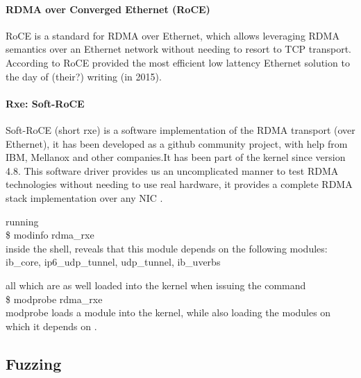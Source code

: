 
\paragraph{RDMA over Converged Ethernet (RoCE)}

RoCE is a standard for RDMA over Ethernet, which allows leveraging RDMA semantics over an Ethernet network without needing
to resort to TCP transport. According to \cite{rdmamanual} RoCE provided the most efficient low lattency Ethernet
solution to the day of (their?) writing (in 2015).

\paragraph{Rxe: Soft-RoCE}

Soft-RoCE (short rxe) is a software implementation of the RDMA transport (over Ethernet), it has been developed as a github 
community project, with help from IBM, Mellanox and other companies.It has been part of the kernel since version 4.8.
This software driver provides us an uncomplicated manner to test RDMA technologies without needing to use real hardware, it provides a complete 
RDMA stack implementation over any NIC \cite{mellanox-community}.

running \\ \$ modinfo rdma\_rxe \\ inside the shell, reveals that this module depends on the following modules: ib\_core, ip6\_udp\_tunnel, udp\_tunnel, ib\_uverbs 

all which are as well loaded into the kernel when issuing the command \\ \$ modprobe rdma\_rxe \\
modprobe loads a module into the kernel, while also loading the modules on which it depends on \cite{ldd3}.



\subsection{Fuzzing}

